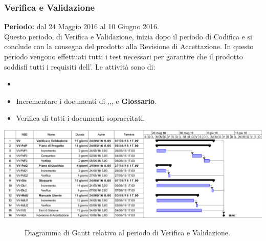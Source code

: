 \subsubsection{Verifica e Validazione}
\textbf{Periodo:} dal 24 Maggio 2016 al 10 Giugno 2016. \\
Questo periodo, di Verifica e Validazione, inizia dopo il periodo di Codifica e si conclude con la consegna del prodotto alla Revisione di Accettazione. In questo periodo vengono effettuati tutti i test necessari per garantire che il prodotto soddisfi tutti i requisiti dell'\AdR.  
Le attività sono di:
\begin{itemize}
	\item   
	\item Incrementare i documenti di \textbf{\MU},\textbf{\NdP},\textbf{\PdP}, \textbf{\PdQ} e \textbf{Glossario}.
	\item Verifica di tutti i documenti sopraccitati.
\end{itemize}
\begin{center}
	\includegraphics[keepaspectratio = true, width=15cm]{immagini/PdP_VerificaEValidazioneGantt.png}
\end{center}
\begin{figure}[h]
	\caption{Diagramma di Gantt relativo al periodo di Verifica e Validazione.}\label{etichetta}
\end{figure}